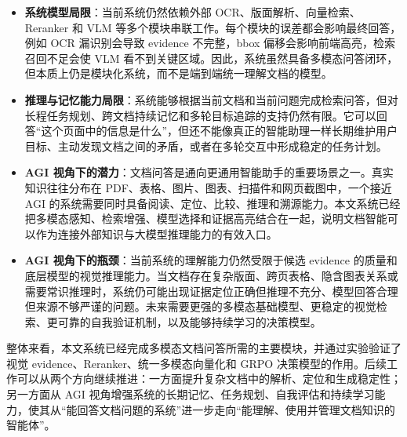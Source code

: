 \begin{itemize}
  \item \textbf{系统模型局限}：当前系统仍然依赖外部 OCR、版面解析、向量检索、Reranker 和 VLM 等多个模块串联工作。每个模块的误差都会影响最终回答，例如 OCR 漏识别会导致 evidence 不完整，bbox 偏移会影响前端高亮，检索召回不足会使 VLM 看不到关键区域。因此，系统虽然具备多模态问答闭环，但本质上仍是模块化系统，而不是端到端统一理解文档的模型。
  \item \textbf{推理与记忆能力局限}：系统能够根据当前文档和当前问题完成检索问答，但对长程任务规划、跨文档持续记忆和多轮目标追踪的支持仍然有限。它可以回答“这个页面中的信息是什么”，但还不能像真正的智能助理一样长期维护用户目标、主动发现文档之间的矛盾，或者在多轮交互中形成稳定的任务计划。
  \item \textbf{AGI 视角下的潜力}：文档问答是通向更通用智能助手的重要场景之一。真实知识往往分布在 PDF、表格、图片、图表、扫描件和网页截图中，一个接近 AGI 的系统需要同时具备阅读、定位、比较、推理和溯源能力。本文系统已经把多模态感知、检索增强、模型选择和证据高亮结合在一起，说明文档智能可以作为连接外部知识与大模型推理能力的有效入口。
  \item \textbf{AGI 视角下的瓶颈}：当前系统的理解能力仍然受限于候选 evidence 的质量和底层模型的视觉推理能力。当文档存在复杂版面、跨页表格、隐含图表关系或需要常识推理时，系统仍可能出现证据定位正确但推理不充分、模型回答合理但来源不够严谨的问题。未来需要更强的多模态基础模型、更稳定的视觉检索、更可靠的自我验证机制，以及能够持续学习的决策模型。
\end{itemize}

整体来看，本文系统已经完成多模态文档问答所需的主要模块，并通过实验验证了视觉 evidence、Reranker、统一多模态向量化和 GRPO 决策模型的作用。后续工作可以从两个方向继续推进：一方面提升复杂文档中的解析、定位和生成稳定性；另一方面从 AGI 视角增强系统的长期记忆、任务规划、自我评估和持续学习能力，使其从“能回答文档问题的系统”进一步走向“能理解、使用并管理文档知识的智能体”。
